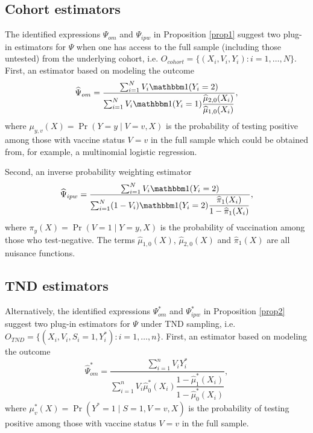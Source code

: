 \begin{appendix}
\begin{refsection}
    \subsection{Cohort estimators}
    The identified expressions $\Psi_{om}$ and $\Psi_{ipw}$ in Proposition \ref{prop1} suggest two plug-in estimators for $\Psi$ when one has access to the full sample (including those untested) from the underlying cohort, i.e. $O_{cohort} = \{(X_i, V_i, Y_i) : i = 1, \ldots, N\}$. First, an estimator based on modeling the outcome
    \begin{equation}\label{eqn:om_estimator_cohort}
        \widehat{\Psi}_{om} = \dfrac{\sum_{i=1}^N V_i \mathbbm 1(Y_i=2)}{\sum_{i=1}^N V_i\mathbbm 1(Y_i=1) \dfrac{\widehat{\mu}_{2,0}(X_i)}{\widehat{\mu}_{1,0}(X_i)}},
    \end{equation}
    where $\mu_{y,v}(X) = \Pr(Y=y \mid V=v, X)$ is the probability of testing positive among those with vaccine status $V = v$ in the full sample which could be obtained from, for example, a multinomial logistic regression. 
    
    Second, an inverse probability weighting estimator
    \begin{equation}\label{eqn:ipw_estimator_cohort}
        \widehat{\Psi}_{ipw} = \dfrac{\sum_{i=1}^N V_i \mathbbm 1(Y_i = 2)}{\sum_{i=1}^N (1 - V_i) \mathbbm 1 (Y_i = 2) \dfrac{\widehat{\pi}_1(X_i)}{1 - \widehat{\pi}_1(X_i)}},
    \end{equation}
    where $\pi_y(X) = \Pr(V=1\mid Y=y, X)$ is the  probability of vaccination among those who test-negative. The terms $\widehat{\mu}_{1,0}(X)$, $\widehat{\mu}_{2,0}(X)$ and $\widehat{\pi}_1(X)$ are all nuisance functions. 

    \subsection{TND estimators}
    Alternatively, the identified expressions $\Psi^*_{om}$ and $\Psi^*_{ipw}$ in Proposition \ref{prop2} suggest two plug-in estimators for $\Psi$ under TND sampling, i.e. $O_{TND} = \{(X_i, V_i, S_i=1, Y^*_i) : i = 1, \ldots, n\}$. First, an estimator based on modeling the outcome
    \begin{equation}\label{eqn:om_estimator_tnd}
        \widehat{\Psi}_{om}^* = \dfrac{\sum_{i=1}^n V_i Y^*_i}{\sum_{i=1}^n V_i \widehat{\mu}^*_0(X_i)\dfrac{1 - \widehat{\mu}^*_1(X_i)}{1 - \widehat{\mu}^*_0(X_i)}},
    \end{equation}
    where $\mu^*_v(X) = \Pr(Y^*=1 \mid S=1, V=v, X)$ is the probability of testing positive among those with vaccine status $V = v$ in the full sample.


\end{refsection}
\end{appendix}
